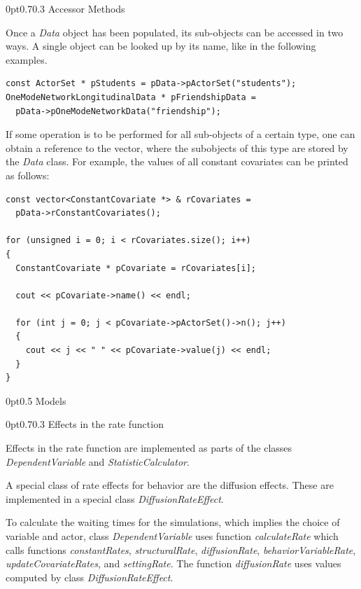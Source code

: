 \documentclass[12pt]{article}
\makeatletter
\renewcommand{\=}{\,=\,}
\newcommand{\+}{\,+\,}
\newcommand{\nnm}[1]{\textsf{\small\textit{#1}}}
\renewcommand{\section}{\@startsection{section}{1}
                {0pt}{\baselineskip}{0.5\baselineskip}
                {\centering\sffamily} }
\renewcommand{\subsection}{\@startsection{subsection}{2}
                {0pt}{0.7\baselineskip}{0.3\baselineskip}
                {\sffamily} }
\makeatother
\begin{document}
\subsection{Accessor Methods}

Once a \nnm{Data} object has been populated, its sub-objects can be accessed
in two ways. A single object can be looked up by its name, like in the following
examples.
\begin{verbatim}
const ActorSet * pStudents = pData->pActorSet("students");
OneModeNetworkLongitudinalData * pFriendshipData =
  pData->pOneModeNetworkData("friendship");
\end{verbatim}
If some operation is to be performed for all sub-objects of a certain type, one
can obtain a reference to the vector, where the subobjects of this type are
stored by the \nnm{Data} class. For example, the values of all constant
covariates can be printed as follows:
\begin{verbatim}
const vector<ConstantCovariate *> & rCovariates =
  pData->rConstantCovariates();

for (unsigned i = 0; i < rCovariates.size(); i++)
{
  ConstantCovariate * pCovariate = rCovariates[i];

  cout << pCovariate->name() << endl;

  for (int j = 0; j < pCovariate->pActorSet()->n(); j++)
  {
    cout << j << " " << pCovariate->value(j) << endl;
  }
}
\end{verbatim}

\section{Models}

\subsection{Effects in the rate function}

Effects in the rate function are implemented as parts of the classes
\nnm{DependentVariable} and \nnm{StatisticCalculator}.

A special class of rate effects for behavior are the diffusion effects.
These are implemented in a special class \nnm{DiffusionRateEffect}.

To calculate the waiting times for the simulations,
which implies the choice of variable and actor,
class \nnm{DependentVariable} uses function
\nnm{calculateRate} which calls functions \nnm{constantRates}, \nnm{structuralRate}, \nnm{diffusionRate}, \nnm{behaviorVariableRate},
\nnm{updateCovariateRates}, and \nnm{settingRate}.
The function \nnm{diffusionRate} uses values computed by class
\nnm{DiffusionRateEffect}.
\end{document}
